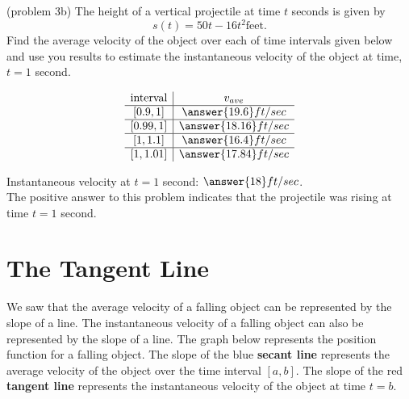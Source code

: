 \documentclass{ximera}
\begin{document}
\begin{problem}(problem 3b)
The height of a vertical projectile at time $t$ seconds is given by
\[
s(t) = 50t - 16t^2 \text{feet}.
\]
Find the average velocity of the object over each of time intervals given below and use you results to estimate the instantaneous velocity
of the object at time, $t = 1$ second.

\[
\begin{array}{ c | c  }
   \text{interval}& v_{ave} \\ 
	\hline
	[0.9, 1] & \answer{19.6}ft/sec \\
	\hline
	[0.99, 1] & \answer{18.16}ft/sec \\
	\hline
	[1, 1.1] & \answer{16.4}ft/sec \\
	\hline
	[1, 1.01] & \answer{17.84}ft/sec
\end{array}
\]


Instantaneous velocity at $t = 1$ second: $\answer{18}ft/sec$.\\
The positive answer to this problem indicates that the projectile was rising at time $t= 1$ second.

\end{problem}

\section{The Tangent Line}
We saw that the average velocity of a falling object can be represented by the slope of a line. 
The instantaneous velocity of a falling object can also be represented by the slope of a line.
The graph below represents the position function for a falling object.  
The slope of the blue \textbf{secant line} represents the average velocity of the object over the time interval $[a,b]$.
The slope of the red \textbf{tangent line} represents the instantaneous velocity of the object at time $t = b$.
\end{document}
